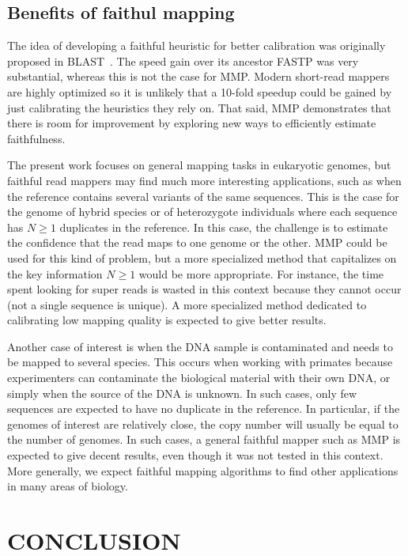 \documentclass[a4,center,fleqn]{NAR}
\begin{document}
\subsection{Benefits of faithul mapping}

The idea of developing a faithful heuristic for better calibration was
originally proposed in BLAST~\cite{pmid2231712}. The speed gain over its
ancestor FASTP was very substantial, whereas this is not the case for MMP.
Modern short-read mappers are highly optimized so it is unlikely that a
10-fold speedup could be gained by just calibrating the heuristics they
rely on. That said, MMP demonstrates that there is room for improvement by
exploring new ways to efficiently estimate faithfulness.

The present work focuses on general mapping tasks in eukaryotic genomes,
but faithful read mappers may find much more interesting applications,
such as when the reference contains several variants of the same
sequences. This is the case for the genome of hybrid species or of
heterozygote individuals where each sequence has $N \geq 1$ duplicates in
the reference. In this case, the challenge is to estimate the confidence
that the read maps to one genome or the other. MMP could be used for this
kind of problem, but a more specialized method that capitalizes on the key
information $N \geq 1$ would be more appropriate. For instance, the time
spent looking for super reads is wasted in this context because they
cannot occur (not a single sequence is unique). A more specialized method
dedicated to calibrating low mapping quality is expected to give better
results.

Another case of interest is when the DNA sample is contaminated and needs
to be mapped to several species. This occurs when working with primates
because experimenters can contaminate the biological material with their
own DNA, or simply when the source of the DNA is unknown. In such cases,
only few sequences are expected to have no duplicate in the reference. In
particular, if the genomes of interest are relatively close, the copy
number will usually be equal to the number of genomes. In such cases, a
general faithful mapper such as MMP is expected to give decent results,
even though it was not tested in this context. More generally, we expect
faithful mapping algorithms to find other applications in many areas of
biology. 


\section{CONCLUSION}
\end{document}
